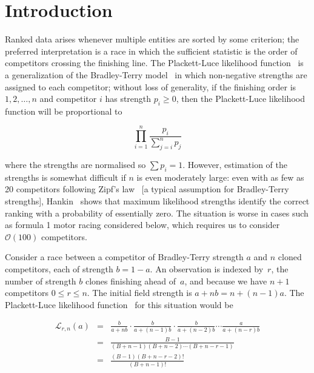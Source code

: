 \documentclass[ejs,noshowframe]{imsart}
\theoremstyle{plain}
\theoremstyle{definition}
\theoremstyle{remark}
\begin{document}
\section{Introduction}

Ranked data arises whenever multiple entities are sorted by some
criterion; the preferred interpretation is a race in which the
sufficient statistic is the order of competitors crossing the
finishing line.  The Plackett-Luce likelihood
function~\cite{luce1959,plackett1975} is a generalization of the
Bradley-Terry model~\cite{bradley1952} in which non-negative strengths
are assigned to each competitor; without loss of generality, if the
finishing order is $1,2,\ldots,n$ and competitor $i$ has strength
$p_i\geqslant 0$, then the Plackett-Luce likelihood function will be
proportional to

\begin{equation}\label{plackettluce}
\prod_{i=1}^n\frac{p_i}{\sum_{j=i}^np_j}
\end{equation}

\noindent where the strengths are normalised so $\sum p_i=1$.
However, estimation of the strengths is somewhat difficult if $n$ is
even moderately large: even with as few as 20 competitors following
Zipf's law~\cite{zipf1949} [a typical assumption for Bradley-Terry
  strengths], Hankin~\cite{hankin2017_rmd} shows that maximum
likelihood strengths identify the correct ranking with a probability
of essentially zero.  The situation is worse in cases such as formula
1 motor racing considered below, which requires us to consider
${\mathcal O}(100)$ competitors.

Consider a race between a competitor of Bradley-Terry strength $a$ and
$n$ cloned competitors, each of strength $b=1-a$.  An observation is
indexed by~$r$, the number of strength $b$ clones finishing ahead
of~$a$, and because we have $n+1$ competitors %
$0\leqslant r\leqslant n$.  The initial field strength is
$a+nb=n+(n-1)a$.  The Plackett-Luce likelihood
function~\cite{luce1959,plackett1975} for this situation would be

\begin{eqnarray}\label{likeforrn1}
  \mathcal{L}_{r,n}(a) &=&
\frac{b}{a+ n   b}\cdot
\frac{b}{a+(n-1)b}\cdot
\frac{b}{a+(n-2)b}\cdots
\frac{a}{a+(n-r)b}\\ \label{likeforrn2}
&=& \frac{B-1}{(B+n-1)(B+n-2)\cdots(B+n-r-1)}\\ \label{likeforrn3}
&=& \frac{(B-1)(B+n-r-2)!}{(B+n-1)!}
\end{eqnarray}
\end{document}
